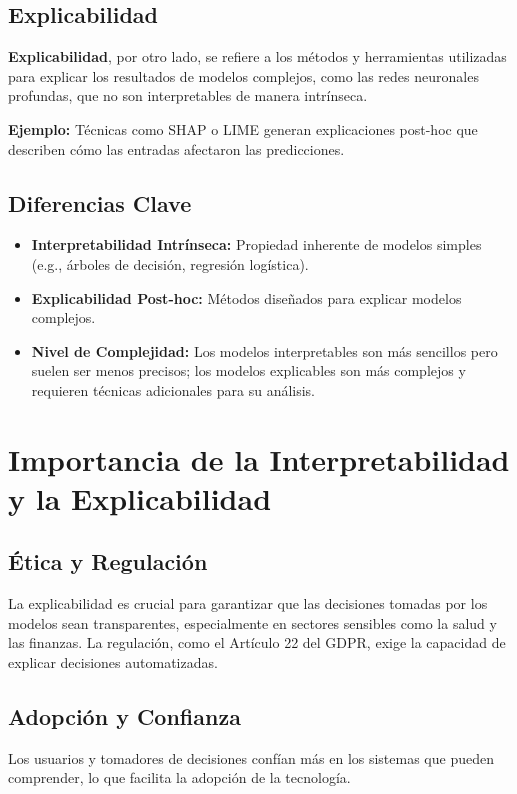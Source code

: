 \begin{refsection}
\subsection{Explicabilidad}
\textbf{Explicabilidad}, por otro lado, se refiere a los métodos y herramientas utilizadas para explicar los resultados de modelos complejos, como las redes neuronales profundas, que no son interpretables de manera intrínseca.

\textbf{Ejemplo:} Técnicas como SHAP o LIME generan explicaciones post-hoc que describen cómo las entradas afectaron las predicciones.

\subsection{Diferencias Clave}
\begin{itemize}
    \item \textbf{Interpretabilidad Intrínseca:} Propiedad inherente de modelos simples (e.g., árboles de decisión, regresión logística).
    \item \textbf{Explicabilidad Post-hoc:} Métodos diseñados para explicar modelos complejos.
    \item \textbf{Nivel de Complejidad:} Los modelos interpretables son más sencillos pero suelen ser menos precisos; los modelos explicables son más complejos y requieren técnicas adicionales para su análisis.
\end{itemize}

\section{Importancia de la Interpretabilidad y la Explicabilidad}
\subsection{Ética y Regulación}
La explicabilidad es crucial para garantizar que las decisiones tomadas por los modelos sean transparentes, especialmente en sectores sensibles como la salud y las finanzas. La regulación, como el Artículo 22 del GDPR, exige la capacidad de explicar decisiones automatizadas.

\subsection{Adopción y Confianza}
Los usuarios y tomadores de decisiones confían más en los sistemas que pueden comprender, lo que facilita la adopción de la tecnología.


\end{refsection}
